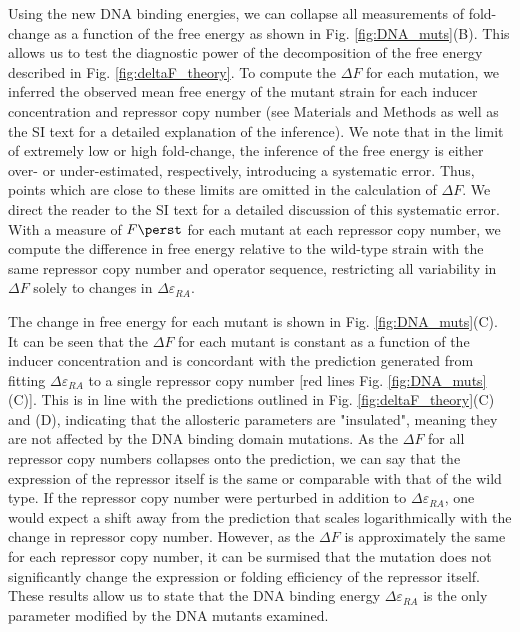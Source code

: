 Using the new DNA binding energies, we can collapse all measurements of
fold-change as a function of the free energy as shown in Fig.
\ref{fig:DNA_muts}(B). This allows us to test the diagnostic power of the
decomposition of the free energy described in Fig. \ref{fig:deltaF_theory}. To 
compute the $\Delta F$ for each mutation, we inferred the observed
mean free energy of the mutant
strain for each inducer concentration and repressor copy number (see Materials and Methods
as well as the SI text for a detailed explanation of the inference). We note
that in the limit of extremely low or high fold-change, the inference of the
free energy is either over- or under-estimated, respectively, introducing a
systematic error. Thus, points which are close to these limits are omitted in
the calculation of $\Delta F$. We direct the reader to the SI text for a
detailed discussion of this systematic error. With a measure of $F\perst$
for each mutant at each repressor copy number, we compute the difference in free
energy relative to the wild-type strain with the same repressor copy number and operator sequence,
restricting all variability in $\Delta F$ solely to changes in
$\Delta\varepsilon_{RA}$. 

The change in free energy for each mutant is shown in Fig.
\ref{fig:DNA_muts}(C). It can be seen that the $\Delta F$ for each mutant is
constant as a function of the inducer concentration and is concordant with the
prediction generated from fitting $\Delta\varepsilon_{RA}$ to a single repressor
copy number [red lines Fig. \ref{fig:DNA_muts}(C)]. This is in line with the
predictions outlined in Fig. \ref{fig:deltaF_theory}(C) and (D), indicating that
the allosteric parameters are "insulated", meaning they are not affected by the
DNA binding domain mutations. As the $\Delta F$ for all repressor copy numbers collapses onto the
prediction, we can say that the expression of the repressor itself is the same
or comparable with that of the wild type. If the repressor copy number were perturbed in addition to $\Delta
\varepsilon_{RA}$, one would expect a shift away from the prediction that scales logarithmically
with the change in repressor copy number. However, as the $\Delta F$
is approximately the same for each repressor copy number, it can be surmised
that the mutation does not significantly change the expression or folding
efficiency of the repressor itself.  These results allow us to state that the DNA binding energy
$\Delta\varepsilon_{RA}$ is the only parameter modified by the DNA mutants
examined.


